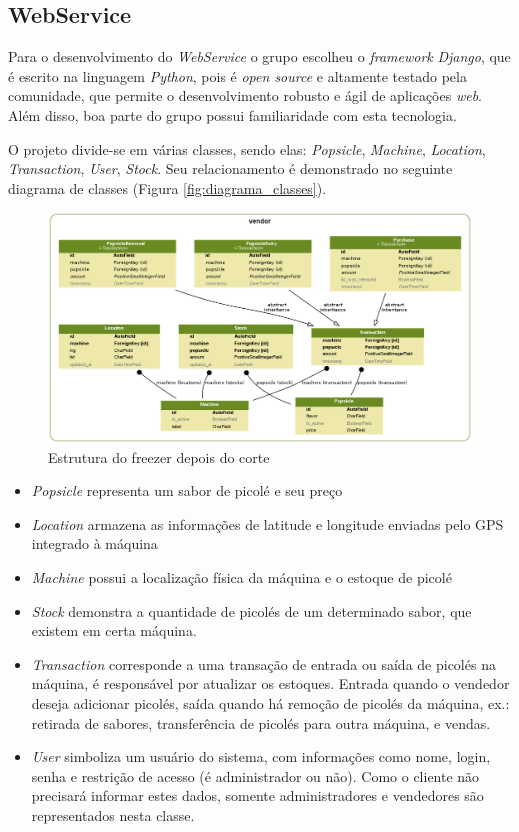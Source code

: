 \subsection{WebService}
Para o desenvolvimento do \textit{WebService} o grupo escolheu o \textit{framework} \textit{Django}, que é escrito na linguagem \textit{Python}, pois é \textit{open source} e altamente testado pela comunidade, que permite o desenvolvimento robusto e ágil de aplicações \textit{web}. Além disso, boa parte do grupo possui familiaridade com esta tecnologia.

O projeto divide-se em várias classes, sendo elas: \textit{Popsicle}, \textit{Machine}, \textit{Location}, \textit{Transaction}, \textit{User}, \textit{Stock}. Seu relacionamento é demonstrado no seguinte diagrama de classes (Figura \ref{fig:diagrama_classes}).

\begin{figure}[H]
\centering
\includegraphics[width=\textwidth]{figuras/diagrama_classes}
 \caption{Estrutura do freezer depois do corte}
\label{fig:freezer cortado}
\end{figure}

\begin{itemize}
\item \textit{Popsicle} representa um sabor de picolé e seu preço
\item \textit{Location} armazena as informações de latitude e longitude enviadas pelo GPS integrado à máquina
\item \textit{Machine} possui a localização física da máquina e o estoque de picolé
\item \textit{Stock} demonstra a quantidade de picolés de um determinado sabor, que existem em certa máquina.
\item \textit{Transaction} corresponde a uma transação de entrada ou saída de picolés na máquina, é responsável por atualizar os estoques. Entrada quando o vendedor deseja adicionar picolés, saída quando há remoção de picolés da máquina, ex.: retirada de sabores, transferência de picolés para outra máquina, e vendas.
\item \textit{User} simboliza um usuário do sistema, com informações como nome, login, senha e restrição de acesso (é administrador ou não). Como o cliente não precisará informar estes dados, somente administradores e vendedores são representados nesta classe.
\end{itemize}


